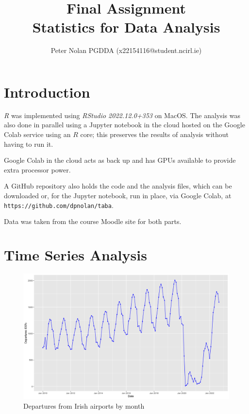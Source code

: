\documentclass[conference]{IEEEtran}
\begin{document}
\title{Final Assignment\\ Statistics for Data Analysis}
\author{Peter Nolan PGDDA (x22154116@student.ncirl.ie)}
\maketitle

\section{Introduction}

\textit{R} was implemented using \textit{RStudio 2022.12.0+353} on MacOS.  The analysis was also done in parallel using a Jupyter notebook in the cloud hosted on the Google Colab service using an $R$ core; this preserves the results of analysis without having to run it.  

Google Colab in the cloud acts as back up and has GPUs available to provide extra processor power.  

A GitHub repository also holds the code and the analysis files, which can be downloaded or, for the Jupyter notebook, run in place, via Google Colab, at \texttt{https://github.com/dpnolan/taba}.  

Data was taken from the course Moodle site for both parts.  

\section{Time Series Analysis}

\begin{figure}
    \centering
    \includegraphics[width=1\textwidth]{ts_departs.png}
    \caption{Departures from Irish airports by month}
    \label{fig:ts_departs}
\end{figure}
\end{document}
